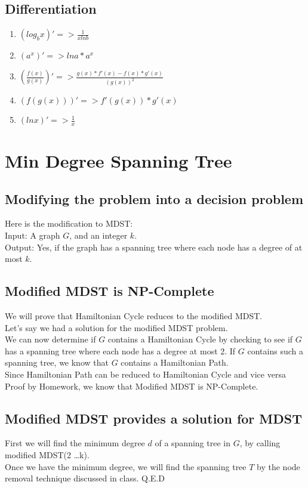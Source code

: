 \documentclass[7pt,twocolumn]{article}
\begin{document}
\subsection{Differentiation}
\begin{enumerate}
    \item $(log_bx)' => \frac{1}{xlnb}$
    \item $(a^x)' => lna*a^x$
    \item $(\frac{f(x)}{g(x)})' => \frac{g(x)*f'(x)-f(x)*g'(x)}{(g(x))^2}$
    \item $(f(g(x)))' => f'(g(x))*g'(x)$
    \item $(lnx)' => \frac{1}{x}$
\end{enumerate}

\section{ Min Degree Spanning Tree }
\subsection{Modifying the problem into a decision problem}
Here is the modification to MDST:\\
Input: A graph $G$, and an integer $k$.\\
Output: Yes, if the graph has a spanning tree where each node has a degree of at most $k$.\\
\subsection{Modified MDST is NP-Complete}
We will prove that Hamiltonian Cycle reduces to the modified MDST.\\
Let's say we had a solution for the modified MDST problem.\\
We can now determine if $G$ contains a Hamiltonian Cycle by checking to see if $G$ has a spanning tree where each node has a degree at most 2. If $G$ contains such a spanning tree, we know that $G$ contains a Hamiltonian Path.\\
Since Hamiltonian Path can be reduced to Hamiltonian Cycle and vice versa {Proof by Homework}, we know that Modified MDST is NP-Complete.
\subsection{Modified MDST provides a solution for MDST}
First we will find the minimum degree $d$ of a spanning tree in $G$, by calling modified MDST(2 \dots k).\\
Once we have the minimum degree, we will find the spanning tree $T$ by the node removal technique discussed in class.
Q.E.D
\end{document}
